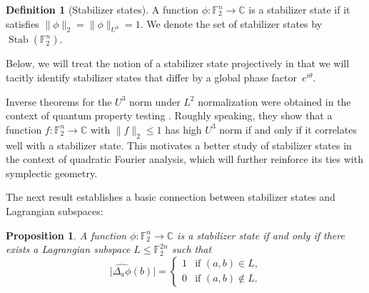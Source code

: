 \documentclass[11pt]{amsart}
\DeclareMathOperator{\Stab}{Stab}\DeclareMathOperator{\Spec}{Spec}
\newcommand{\C}{\mathbb{C}} %
\newcommand{\F}{\mathbb{F}} %
\theoremstyle{plain}
\newtheorem{proposition}[theorem]{Proposition}
\theoremstyle{definition}
\newtheorem{definition}[theorem]{Definition}
\theoremstyle{remark}
\begin{document}
\begin{definition}[Stabilizer states]
A function $\phi:\F_2^n\to \C$ is a stabilizer state if it satisfies $\|\phi\|_{2} = \|\phi\|_{U^3} = 1$.
We denote the set of stabilizer states by~$\Stab(\F_2^n)$.
\end{definition}

Below, we will treat the notion of a stabilizer state projectively in that we will tacitly identify stabilizer states that differ by a global phase factor~$e^{i\theta}$.

Inverse theorems for the $U^3$ norm under $L^2$ normalization were obtained in the context of quantum property testing \cite{ad2024tolerant, bao2025tolerant, mehraban2024improved}.
Roughly speaking, they show that a function $f: \F_2^n \to \C$ with $\|f\|_2 \leq 1$ has high $U^3$ norm if and only if it correlates well with a stabilizer state.
This motivates a better study of stabilizer states in the context of quadratic Fourier analysis, which will further reinforce its ties with symplectic geometry.

The next result establishes a basic connection between stabilizer states and Lagrangian subspaces:

\begin{proposition}\label{prop:stab_Lagrangian}
    A function $\phi: \F_2^n \to \C$ is a stabilizer state if and only if there exists a Lagrangian subspace $L \leq \F_2^{2n}$ such that
    \begin{equation} \label{eg:Lphi}
        \big|\widehat{\Delta_a\phi}(b)\big| =
        \begin{cases}
			1 & \text{if $(a, b) \in L$,}\\
            0 & \text{if $(a, b) \notin L$.}
		 \end{cases}
    \end{equation}
\end{proposition}
\end{document}
